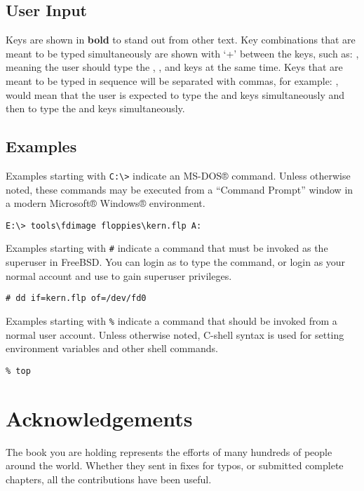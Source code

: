 \subsection{User Input}

Keys are shown in \textbf{bold} to stand out from other text.
Key combinations that are meant to be typed simultaneously are shown with `+'
between the keys, such as: , meaning the user should type
the , , and  keys at the same time.
Keys that are meant to be typed in sequence will be separated with commas, for
example: ,  would mean that the user is expected to type
the  and  keys simultaneously and then to type the 
and  keys simultaneously.


\subsection{Examples}

Examples starting with \texttt{C:\textbackslash\textgreater} indicate an MS-DOS® command.
Unless otherwise noted, these commands may be executed from a ``Command Prompt''
window in a modern Microsoft® Windows® environment.
\begin{lstlisting}
E:\> tools\fdimage floppies\kern.flp A:
\end{lstlisting}

Examples starting with \texttt{\#} indicate a command that must be invoked as the
superuser in FreeBSD.
You can login as  to type the command, or login as your normal
account and use  to gain superuser privileges.
\begin{lstlisting}
# dd if=kern.flp of=/dev/fd0
\end{lstlisting}

Examples starting with \texttt{\%} indicate a command that should be invoked
from a normal user account.
Unless otherwise noted, C-shell syntax is used for setting environment variables
and other shell commands.
\begin{lstlisting}
% top
\end{lstlisting}





\section{Acknowledgements}

The book you are holding represents the efforts of many hundreds of people
around the world.
Whether they sent in fixes for typos, or submitted complete chapters, all the
contributions have been useful.

